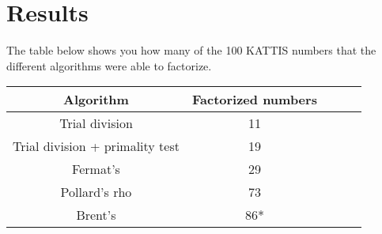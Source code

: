 \documentclass[paper=a4, fontsize=11pt,numbers=endperiod]{scrartcl} %
\numberwithin{equation}{section} %
\numberwithin{figure}{section} %
\numberwithin{table}{section} %
\begin{document}
\section{Results}

The table below shows you how many of the 100 KATTIS numbers that the different algorithms were able to factorize.

    \begin{tabular}{|c|c|c|c|c|}
    \hline
    \textbf{Algorithm} & \textbf{Factorized numbers} \\ \hline
    Trial division & 11 \\ \hline
    Trial division + primality test & 19 \\ \hline
    Fermat's & 29 \\ \hline
    Pollard's rho & 73 \\ \hline
    Brent's & 86* \\ \hline
    \end{tabular}
    \hspace{10pt}
\end{document}
